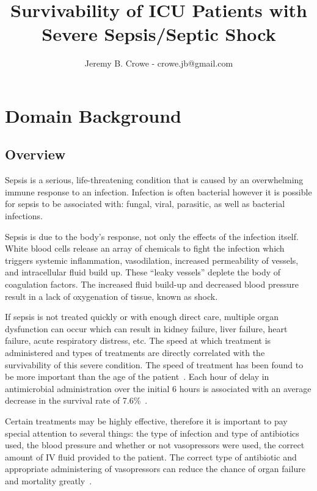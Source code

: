 \documentclass[11pt]{article}
\begin{document}
\title{Survivability of ICU Patients with Severe Sepsis/Septic Shock}
\author{Jeremy B. Crowe - crowe.jb@gmail.com}
\maketitle

\section{Domain Background}
\subsection{Overview}
Sepsis is a serious, life-threatening condition that is caused by an overwhelming immune response to an infection. Infection is often bacterial however it is possible for sepsis to be associated with: fungal, viral, parasitic, as well as bacterial infections.

Sepsis is due to the body's response, not only the effects of the infection itself. White blood cells release an array of chemicals to fight the infection which triggers systemic inflammation, vasodilation, increased permeability of vessels, and intracellular fluid build up. These ``leaky vessels'' deplete the body of coagulation factors. The increased fluid build-up and decreased blood pressure result in a lack of oxygenation of tissue, known as shock.

If sepsis is not treated quickly or with enough direct care, multiple organ dysfunction can occur which can result in kidney failure, liver failure, heart failure, acute respiratory distress, etc. The speed at which treatment is administered and types of treatments are directly correlated with the survivability of this severe condition. The speed of treatment has been found to be more important than the age of the patient~\cite{survival2}. Each hour of delay in antimicrobial administration over the initial 6 hours is associated with an average decrease in the survival rate of 7.6\%~\cite{survival}.

Certain treatments may be highly effective, therefore it is important to pay special attention to several things: the type of infection and type of antibiotics used, the blood pressure and whether or not vasopressors were used, the correct amount of IV fluid provided to the patient. The correct type of antibiotic and appropriate administering of vasopressors can reduce the chance of organ failure and mortality greatly~\cite{pressors}.
\end{document}
